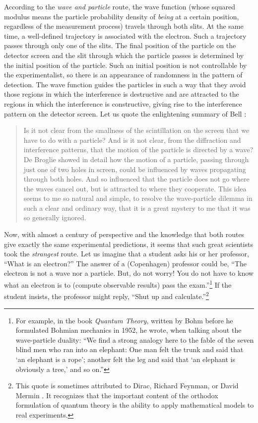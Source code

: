 \documentclass[nofootinbib, secnumarabic, amsmath, nobibnotes,10pt,aps,pra]{revtex4-1}
\begin{document}
According to the \textit{wave and particle} route, the wave function (whose squared modulus means the particle probability density of \textit{being} at a certain position, regardless of the measurement process) travels through both slits. At the same time, a well-defined trajectory is associated with the electron. Such a trajectory passes through only one of the slits. The final position of the particle on the detector screen and the slit through which the particle passes is determined by the initial position of the particle. Such an initial position is not controllable by the experimentalist, so there is an appearance of randomness in the pattern of detection. The wave function guides the particles in such a way that they avoid those regions in which the interference is destructive and are attracted to the regions in which the interference is constructive, giving rise to the interference pattern on the detector screen. Let us quote the enlightening summary of Bell \cite{om.Bell1987}:

\begin{quote}
Is it not clear from the smallness of the scintillation on the screen that we have to do with a particle? And is it not clear, from the diffraction and interference patterns, that the motion of the particle is directed by a wave? De Broglie showed in detail how the motion of a particle, passing through just one of two holes in screen, could be influenced by waves propagating through both holes. And so influenced that the particle does not go where the waves cancel out, but is attracted to where they cooperate. This idea seems to me so natural and simple, to resolve the wave-particle dilemma in such a clear and ordinary way, that it is a great mystery to me that it was so generally ignored.
\end{quote}

Now, with almost a century of perspective and the knowledge that both routes give exactly the same experimental predictions, it seems that such great scientists took the \textit{strangest} route. Let us imagine that a student asks his or her professor, ``What is an electron?'' The answer of a (Copenhagen) professor could be, ``The electron is not a wave nor a particle. But, do not worry! You do not have to know what an electron is to (compute observable results) pass the exam.''\footnote{For example, in the book \textit{Quantum Theory}, \cite{om.bohmbook} written by Bohm before he formulated Bohmian mechanics in 1952, he wrote, when talking about the wave-particle duality: ``We find a strong analogy here to the fable of the seven blind men who ran into an elephant: One man felt the trunk and said that `an elephant is a rope'; another felt the leg and said that `an elephant is obviously a tree,' and so on.''} If the student insists, the professor might reply, ``Shut up and calculate.''\footnote{This quote is sometimes attributed to Dirac, Richard Feynman, or David Mermin \cite{om.mermin,om.mermin2}. It recognizes that the important content of the orthodox formulation of quantum theory is the ability to apply mathematical models to real experiments.}
\end{document}
